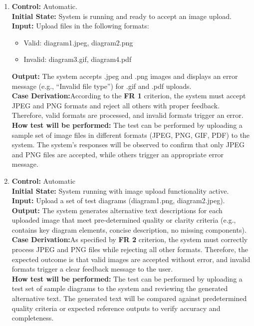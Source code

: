 \documentclass[12pt, titlepage]{article}
\begin{document}
\begin{enumerate}[label=FR-ST \arabic*., wide=0pt, leftmargin=*]
  \item{}
    {\bf Control:} Automatic. \\
    {\bf Initial State:} System is running and ready to accept an
    image upload.\\
    {\bf Input:} Upload files in the following formats:
    \begin{itemize}
      \item Valid: diagram1.jpeg, diagram2.png
      \item Invalid: diagram3.gif, diagram4.pdf
    \end{itemize}
    {\bf Output:} The system accepts .jpeg and .png images and
    displays an error message (e.g., “Invalid file type”) for .gif
    and .pdf uploads.\\
    {\bf  Case Derivation:}According to the \textbf{FR 1} criterion, the system
    must accept JPEG and PNG formats and reject all others with proper
    feedback. Therefore, valid formats are processed, and invalid
    formats trigger an error.\\
    {\bf How test will be performed:} The test can be performed by
    uploading a sample set of image files in different formats (JPEG,
    PNG, GIF, PDF) to the system. The system’s responses will be
    observed to confirm that only JPEG and PNG files are accepted,
    while others trigger an appropriate error message.\\

  \item{}
    {\bf Control:} Automatic\\
    {\bf Initial State:} System running with image upload
    functionality active.\\
    {\bf Input:} Upload a set of test diagrams (diagram1.png, diagram2.jpeg).\\
    {\bf Output:} The system generates alternative text descriptions
    for each uploaded image that meet pre-determined quality or
    clarity criteria (e.g., contains key diagram elements, concise
    description, no missing components).\\
    {\bf  Case Derivation:}As specified by \textbf{FR 2} criterion,
    the system must correctly process JPEG and PNG files while
    rejecting all other formats. Therefore, the expected outcome is
    that valid images are accepted without error, and invalid formats
    trigger a clear feedback message to the user.\\
    {\bf How test will be performed:} The test can be performed by
    uploading a test set of sample diagrams to the system and
    reviewing the generated alternative text. The generated text will
    be compared against predetermined quality criteria or expected
    reference outputs to verify accuracy and completeness.\\


\end{enumerate}
\end{document}
